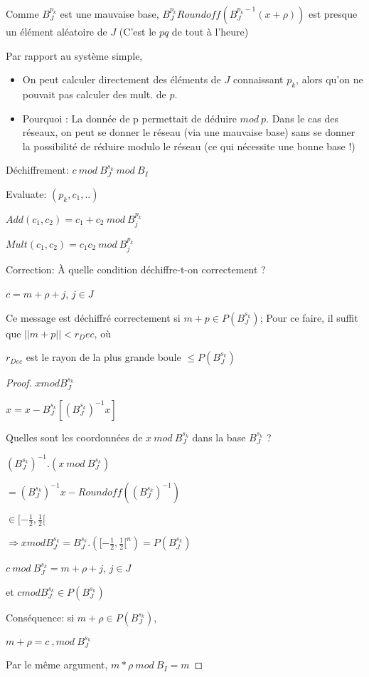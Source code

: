 Comme $B_J^{p_k}$ est une mauvaise base, $B_J^{p_k} Roundoff(B_J^{p_k-1} (x+ \rho))$ est presque un élément aléatoire de $J$ (C'est le $p q$ de tout à l'heure)

Par rapport au système simple,

\begin{itemize}
\item On peut calculer directement des éléments de $J$ connaissant $p_k$, alors qu'on ne pouvait pas calculer des mult. de $p$.
\item Pourquoi : La donnée de p permettait de déduire $mod \ p$. Dans le cas des réseaux, on peut se donner le réseau (via une mauvaise base) sans se donner la possibilité de réduire modulo le réseau (ce qui nécessite une bonne base !)
\end{itemize}

Déchiffrement: $c \ mod \ B_J^{s_k} \ mod \ B_I$

Evaluate: $(p_k,c_1,..)$

$Add(c_1,c_2)=c_1+c_2 \ mod \ B_j^{p_k}$

$Mult(c_1,c_2)=c_1 c_2 \ mod \ B_j^{p_k}$

Correction: À quelle condition déchiffre-t-on correctement ?

$c=m+\rho+j$, $j \in J$

\begin{theorem}
Ce message est déchiffré correctement si $m+p \in P(B_J^{s_k})$;
Pour ce faire, il suffit que $||m+p|| < r_Dec$, où

$r_{Dec}$ est le rayon de la plus grande boule $\leq P(B_J^{s_k})$
\end{theorem}

\begin{proof}
$x mod B_J^{s_k}$

$x = x - B_J^{s_k} [(B_J^{s_k})^{-1} x]$

Quelles sont les coordonnées de $x \ mod \ B_J^{s_k}$ dans la base $B_J^{s_k}$ ?

$(B_J^{s_k})^{-1}. (x \ mod \ B_J^{s_k})$

$= (B_J^{s_k})^{-1} x - Roundoff((B_J^{s_k})^{-1})$

$\in [- \frac{1}{2},\frac{1}{2}[$

$\Rightarrow x mod B_J^{s_k}= B_J^{s_k}.([- \frac{1}{2},\frac{1}{2}[^n)=P(B_J^{s_k})$

$c \ mod \ B_J^{s_k}=m+\rho+j$, $j \in J$

et $c mod B_J^{s_k} \in P(B_J^{s_k})$

Conséquence: si $m+\rho \in P(B_J^{s_k})$,

$m+\rho = c \ ,mod \ B_J^{s_k}$

Par le même argument, $m * \rho \ mod \ B_I = m$
\end{proof}

